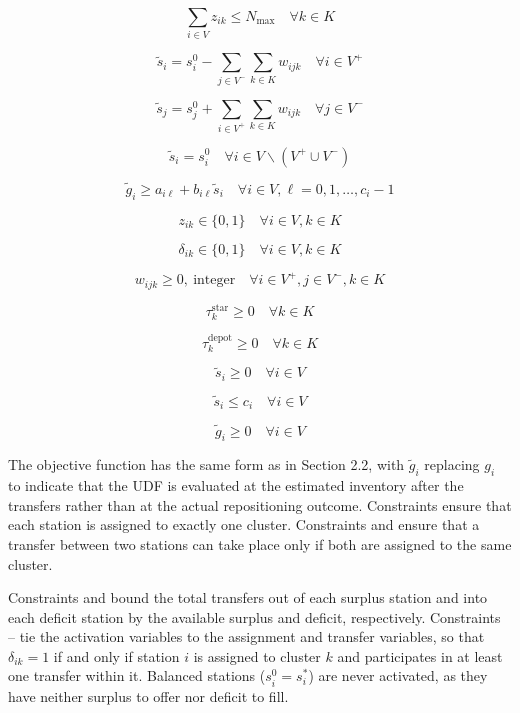 \documentclass[11pt]{article}
\numberwithin{table}{section}
\numberwithin{figure}{section}
\begin{document}
\[
\sum\limits_{i\in V}{{{z}_{ik}}}\le {{N}_{\max }}\quad \forall k\in K
\]

\[
\tilde{s}_i=s_{i}^{0}-\sum\limits_{j\in {{V}^{-}}}{\sum\limits_{k\in K}{{{w}_{ijk}}}}\quad \forall i\in {{V}^{+}}
\]

\[
\tilde{s}_j=s_{j}^{0}+\sum\limits_{i\in {{V}^{+}}}{\sum\limits_{k\in K}{{{w}_{ijk}}}}\quad \forall j\in {{V}^{-}}
\]

\[
{{\tilde{s}}_{i}}=s_{i}^{0}\quad \forall i\in V\backslash \left( {{V}^{+}}\cup {{V}^{-}} \right)
\]

\[
{{\tilde{g}}_{i}}\ge {{a}_{i\ell }}+{{b}_{i\ell }}{{\tilde{s}}_{i}}\quad \forall i\in V,\ell =0,1,\ldots ,{{c}_{i}}-1
\]

\[
{{z}_{ik}}\in \{0,1\}\quad \forall i\in V,k\in K
\]

\[
{{\delta }_{ik}}\in \{0,1\}\quad \forall i\in V,k\in K
\]

\[
{{w}_{ijk}}\ge 0,\ \text{integer}\quad \forall i\in {{V}^{+}},j\in {{V}^{-}},k\in K
\]

\[
\tau _{k}^{\text{star}}\ge 0\quad \forall k\in K
\]

\[
\tau _{k}^{\text{depot}}\ge 0\quad \forall k\in K
\]

\[
\tilde{s}_i \ge 0\quad \forall i\in V
\]

\[
{{\tilde{s}}_{i}}\le {{c}_{i}}\quad \forall i\in V
\]

\[
\tilde{g}_i \ge 0\quad \forall i\in V
\]

The objective function  has the same form as  in Section 2.2, with $\tilde{g}_i$ replacing $g_i$ to indicate that the UDF is evaluated at the estimated inventory after the transfers rather than at the actual repositioning outcome. Constraints  ensure that each station is assigned to exactly one cluster. Constraints  and  ensure that a transfer between two stations can take place only if both are assigned to the same cluster.

Constraints  and  bound the total transfers out of each surplus station and into each deficit station by the available surplus and deficit, respectively. Constraints – tie the activation variables to the assignment and transfer variables, so that ${{\delta }_{ik}}=1$ if and only if station $i$ is assigned to cluster $k$ and participates in at least one transfer within it. Balanced stations ($s_{i}^{0}=s_{i}^{*}$) are never activated, as they have neither surplus to offer nor deficit to fill.
\end{document}
